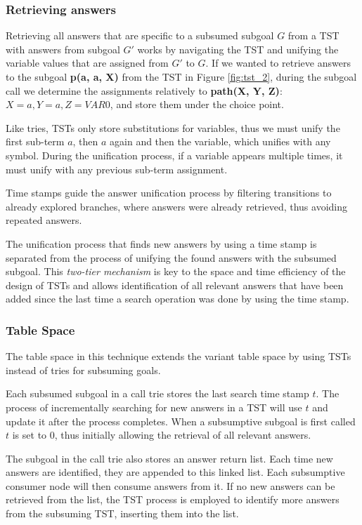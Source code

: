   \subsubsection{Retrieving answers}
  
  Retrieving all answers that are specific to a subsumed subgoal $G$ from a TST with answers from subgoal $G'$
  works by navigating the TST and unifying the variable values that are assigned from $G'$ to $G$.
  If we wanted to retrieve answers to the subgoal \textbf{p(a, a, X)} from the TST in Figure \ref{fig:tst_2},
  during the subgoal call we determine the assignments relatively to \textbf{path(X, Y, Z)}: $X = a, Y = a, Z = VAR0$,
  and store them under the choice point.
  
  Like tries, TSTs only store substitutions for variables, thus we must unify
  the first sub-term $a$, then $a$ again and then the variable, which unifies with any symbol.
  During the unification process, if a variable appears multiple times, it must unify with
  any previous sub-term assignment.
  
  Time stamps guide the answer unification process by filtering transitions to already explored branches, where
  answers were already retrieved, thus avoiding repeated answers.
  
  The unification process that finds new answers by using a time stamp is separated from the process
  of unifying the found answers with the subsumed subgoal. This \textit{two-tier mechanism} is key to the space and time
  efficiency of the design of TSTs \cite{Johnson-99} and allows identification of all relevant answers that have
  been added since the last time a search operation was done by using the time stamp.
  
  \subsubsection{Table Space}

  The table space in this technique extends the variant table space by
  using TSTs instead of tries for subsuming goals.
   
  Each subsumed subgoal in a call trie stores the last search time stamp $t$. The process of
  incrementally searching for new answers in a TST will use $t$ and update it after the process completes.
  When a subsumptive subgoal is first called $t$ is set to $0$, thus initially allowing the retrieval of all
  relevant answers.
  
  The subgoal in the call trie also stores an answer return list. Each time new answers are identified, they are appended
  to this linked list. Each subsumptive consumer node will then consume answers from it. If no
  new answers can be retrieved from the list, the TST process is employed to identify more answers from the subsuming TST,
  inserting them into the list.
  
